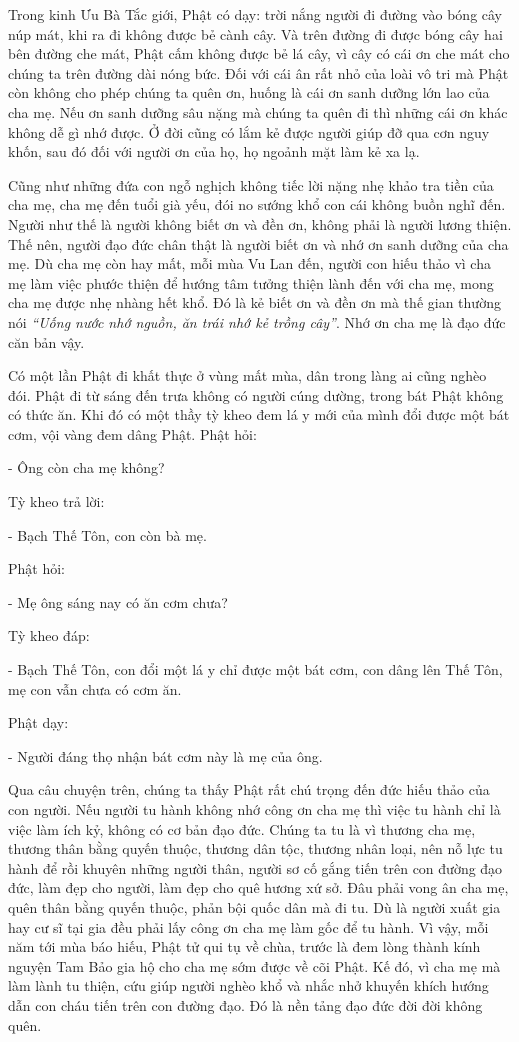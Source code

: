 \documentclass[
  12pt,
  oneside]{book}
\begin{document}
Trong kinh Ưu Bà Tắc giới, Phật có dạy: trời nắng người đi đường vào bóng cây núp mát, khi ra đi không được bẻ cành cây. Và trên đường đi được bóng cây hai bên đường che mát, Phật cấm không được bẻ lá cây, vì cây có cái ơn che mát cho chúng ta trên đường dài nóng bức. Đối với cái ân rất nhỏ của loài vô tri mà Phật còn không cho phép chúng ta quên ơn, huống là cái ơn sanh dưỡng lớn lao của cha mẹ. Nếu ơn sanh dưỡng sâu nặng mà chúng ta quên đi thì những cái ơn khác không dễ gì nhớ được. Ở đời cũng có lắm kẻ được người giúp đỡ qua cơn nguy khốn, sau đó đối với người ơn của họ, họ ngoảnh mặt làm kẻ xa lạ.

Cũng như những đứa con ngỗ nghịch không tiếc lời nặng nhẹ khảo tra tiền của cha mẹ, cha mẹ đến tuổi già yếu, đói no sướng khổ con cái không buồn nghĩ đến. Người như thế là người không biết ơn và đền ơn, không phải là người lương thiện. Thế nên, người đạo đức chân thật là người biết ơn và nhớ ơn sanh dưỡng của cha mẹ. Dù cha mẹ còn hay mất, mỗi mùa Vu Lan đến, người con hiếu thảo vì cha mẹ làm việc phước thiện để hướng tâm tưởng thiện lành đến với cha mẹ, mong cha mẹ được nhẹ nhàng hết khổ. Đó là kẻ biết ơn và đền ơn mà thế gian thường nói \emph{``Uống nước nhớ nguồn, ăn trái nhớ kẻ trồng cây''}. Nhớ ơn cha mẹ là đạo đức căn bản vậy.

Có một lần Phật đi khất thực ở vùng mất mùa, dân trong làng ai cũng nghèo đói. Phật đi từ sáng đến trưa không có người cúng dường, trong bát Phật không có thức ăn. Khi đó có một thầy tỳ kheo đem lá y mới của mình đổi được một bát cơm, vội vàng đem dâng Phật. Phật hỏi:

- Ông còn cha mẹ không?

Tỳ kheo trả lời:

- Bạch Thế Tôn, con còn bà mẹ.

Phật hỏi:

- Mẹ ông sáng nay có ăn cơm chưa?

Tỳ kheo đáp:

- Bạch Thế Tôn, con đổi một lá y chỉ được một bát cơm, con dâng lên Thế Tôn, mẹ con vẫn chưa có cơm ăn.

Phật dạy:

- Người đáng thọ nhận bát cơm này là mẹ của ông.

Qua câu chuyện trên, chúng ta thấy Phật rất chú trọng đến đức hiếu thảo của con người. Nếu người tu hành không nhớ công ơn cha mẹ thì việc tu hành chỉ là việc làm ích kỷ, không có cơ bản đạo đức. Chúng ta tu là vì thương cha mẹ, thương thân bằng quyến thuộc, thương dân tộc, thương nhân loại, nên nỗ lực tu hành để rồi khuyên những người thân, người sơ cố gắng tiến trên con đường đạo đức, làm đẹp cho người, làm đẹp cho quê hương xứ sở. Đâu phải vong ân cha mẹ, quên thân bằng quyến thuộc, phản bội quốc dân mà đi tu. Dù là người xuất gia hay cư sĩ tại gia đều phải lấy công ơn cha mẹ làm gốc để tu hành. Vì vậy, mỗi năm tới mùa báo hiếu, Phật tử qui tụ về chùa, trước là đem lòng thành kính nguyện Tam Bảo gia hộ cho cha mẹ sớm được về cõi Phật. Kế đó, vì cha mẹ mà làm lành tu thiện, cứu giúp người nghèo khổ và nhắc nhở khuyến khích hướng dẫn con cháu tiến trên con đường đạo. Đó là nền tảng đạo đức đời đời không quên.
\end{document}
